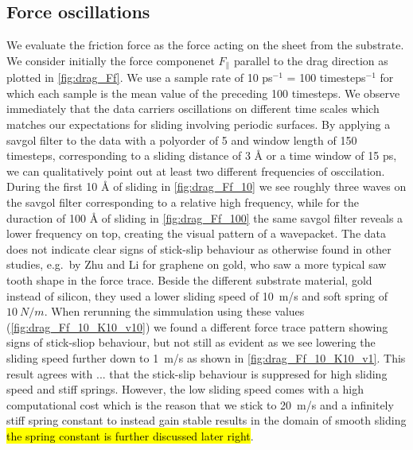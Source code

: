 \subsection{Force oscillations}\label{sec:force_oscillations}
We evaluate the friction force as the force acting on the sheet from the
substrate. We consider initially the force componenet $F_{\parallel}$ parallel
to the drag direction as plotted in \cref{fig:drag_Ff}. We use a sample rate of
10 ps$^{-1}$ = 100 timesteps$^{-1}$ for which each sample is the mean value of
the preceding 100 timesteps. We observe immediately that the data carriers
oscillations on different time scales which matches our expectations for sliding
involving periodic surfaces. By applying a savgol filter to the data with a
polyorder of 5 and window length of 150 timesteps, corresponding to a sliding
distance of 3 Å or a time window of 15 ps, we can qualitatively point out at
least two different frequencies of osccilation. During the first 10 Å of sliding
in \cref{fig:drag_Ff_10} we see roughly three waves on the savgol filter
corresponding to a relative high frequency, while for the duraction of 100 Å of
sliding in \cref{fig:drag_Ff_100} the same savgol filter reveals a lower
frequency on top, creating the visual pattern of a wavepacket. The data does not
indicate clear signs of stick-slip behaviour as otherwise found in other
studies, e.g.\ by Zhu and Li \cite{zhu_study_2018} for graphene on gold, who saw
a more typical saw tooth shape in the force trace. Beside the different
substrate material, gold instead of silicon, they used a lower sliding speed of
\SI{10}{m/s} and soft spring of $\SI{10}{N/m}$. When rerunning the simmulation
using these values (\cref{fig:drag_Ff_10_K10_v10}) we found a different force
trace pattern showing signs of stick-sliop behaviour, but not still as evident
as we see lowering the sliding speed further down to \SI{1}{m/s} as shown in
\cref{fig:drag_Ff_10_K10_v1}. This result agrees with ... that the stick-slip
behaviour is suppresed for high sliding speed and stiff springs. However, the low sliding speed comes with a high computational cost which is the reason that we stick to \SI{20}{m/s} and a infinitely stiff spring constant to instead gain stable results in the domain of smooth sliding \hl{the spring constant is further discussed later right}.



